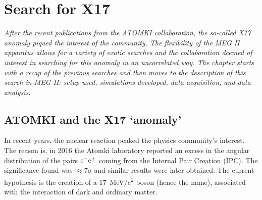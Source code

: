 \chapter{Search for X17}
\begin{refsection}
\label{ch:X17}
{\itshape After the recent publications from the ATOMKI collaboration, the so-called X17 anomaly piqued the interest of the community. The flexibility of the MEG II apparatus allows for a variety of exotic searches and the collaboration deemed of interest in searching for this anomaly in an uncorrelated way.
The chapter starts with a recap of the previous searches and then moves to the description of this search in MEG II: setup used, simulations developed, data acquisition, and data analysis.}

\section{ATOMKI and the X17 `anomaly'}
    In recent years, the nuclear reaction  peaked the physics community's interest.
    The reason is, in 2016 the Atomki laboratory reported an excess in the angular distribution of the pairs $\text{e}^- \text{e}^+$ coming from the Internal Pair Creation (IPC).
    The significance found was $\approx7\sigma$ and similar results were later obtained.
    The current hypothesis is the creation of a \SI{17}{MeV/c^2} boson (hence the name), associated with the interaction of dark and ordinary matter.
    

\end{refsection}
